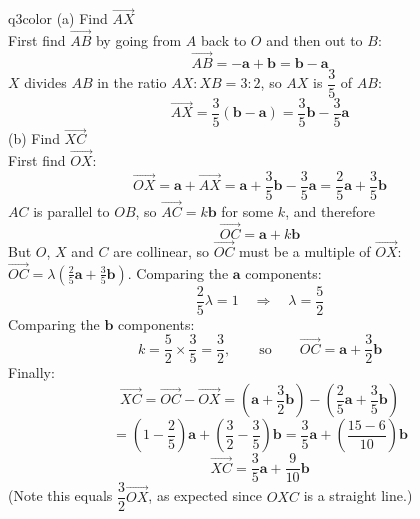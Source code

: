 \documentclass[11pt,a4paper]{article}
\begin{document}
\begin{ansbox}{q3color}
(a) Find $\overrightarrow{AX}$\\[4pt]
First find $\overrightarrow{AB}$ by going from $A$ back to $O$ and then out to $B$:
\[
\overrightarrow{AB} = -\mathbf{a} + \mathbf{b} = \mathbf{b} - \mathbf{a}
\]
$X$ divides $AB$ in the ratio $AX : XB = 3 : 2$, so $AX$ is $\dfrac{3}{5}$ of $AB$:
\[
\overrightarrow{AX} = \frac{3}{5}(\mathbf{b} - \mathbf{a}) = \boxed{\frac{3}{5}\mathbf{b} - \frac{3}{5}\mathbf{a}}
\]
(b) Find $\overrightarrow{XC}$\\[4pt]
First find $\overrightarrow{OX}$:
\[
\overrightarrow{OX} = \mathbf{a} + \overrightarrow{AX} = \mathbf{a} + \frac{3}{5}\mathbf{b} - \frac{3}{5}\mathbf{a} = \frac{2}{5}\mathbf{a} + \frac{3}{5}\mathbf{b}
\]
$AC$ is parallel to $OB$, so $\overrightarrow{AC} = k\mathbf{b}$ for some $k$, and therefore
\[
\overrightarrow{OC} = \mathbf{a} + k\mathbf{b}
\]
But $O$, $X$ and $C$ are collinear, so $\overrightarrow{OC}$ must be a multiple of $\overrightarrow{OX}$: $\overrightarrow{OC} = \lambda\left(\frac{2}{5}\mathbf{a} + \frac{3}{5}\mathbf{b}\right)$. Comparing the $\mathbf{a}$ components:
\[
\frac{2}{5}\lambda = 1 \quad\Longrightarrow\quad \lambda = \frac{5}{2}
\]
Comparing the $\mathbf{b}$ components:
\[
k = \frac{5}{2}\times\frac{3}{5} = \frac{3}{2}, \qquad \text{so} \qquad \overrightarrow{OC} = \mathbf{a} + \frac{3}{2}\mathbf{b}
\]
Finally:
\[
\overrightarrow{XC} = \overrightarrow{OC} - \overrightarrow{OX} = \left(\mathbf{a} + \frac{3}{2}\mathbf{b}\right) - \left(\frac{2}{5}\mathbf{a} + \frac{3}{5}\mathbf{b}\right)
\]
\[
= \left(1 - \frac{2}{5}\right)\mathbf{a} + \left(\frac{3}{2} - \frac{3}{5}\right)\mathbf{b} = \frac{3}{5}\mathbf{a} + \left(\frac{15 - 6}{10}\right)\mathbf{b}
\]
\[
\boxed{\overrightarrow{XC} = \frac{3}{5}\mathbf{a} + \frac{9}{10}\mathbf{b}}
\]
(Note this equals $\dfrac{3}{2}\overrightarrow{OX}$, as expected since $OXC$ is a straight line.)
\end{ansbox}
\end{document}
